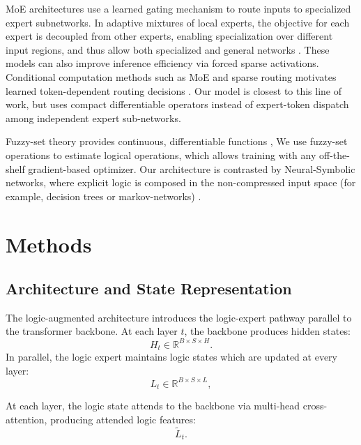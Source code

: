 \documentclass[10pt,twocolumn,letterpaper]{article}
\begin{document}
MoE architectures use a learned gating mechanism to route
inputs to specialized expert subnetworks. In adaptive mixtures of local experts,
the objective for each expert is decoupled from other experts, enabling
specialization over different input regions, and thus allow both specialized and
general networks \cite{6797059}. These models can also improve inference efficiency
via forced sparse activations.
Conditional computation methods such as MoE and sparse
routing motivates learned token-dependent routing decisions
\cite{shazeer2017outrageouslylargeneuralnetworks,fedus2022switchtransformersscalingtrillion}.
Our model is closest to this line of work, but uses compact differentiable
operators instead of expert-token dispatch among independent expert sub-networks.

Fuzzy-set theory provides continuous, differentiable functions \cite{ZADEH1965338},
We use fuzzy-set operations to estimate logical operations,
which allows training with any off-the-shelf gradient-based optimizer.
Our architecture is contrasted by Neural-Symbolic networks,
where explicit logic is composed in the non-compressed input space
(for example, decision trees or markov-networks)
\cite{besold2017neuralsymboliclearningreasoningsurvey}.

\section{Methods}

\subsection{Architecture and State Representation}

The logic-augmented architecture introduces the logic-expert pathway parallel to
the transformer backbone. At each layer $t$, the backbone produces hidden states:
\begin{equation}
H_t \in \mathbb{R}^{B \times S \times H}.
\end{equation}
In parallel, the logic expert maintains logic states which are updated at every layer:
\begin{equation}
L_t \in \mathbb{R}^{B \times S \times L},
\end{equation}

At each layer, the logic state attends to the backbone via multi-head cross-attention,
producing attended logic features:
\begin{equation}
\tilde{L}_t.
\end{equation}
\end{document}
